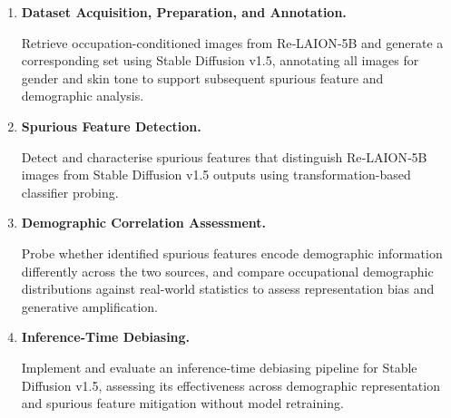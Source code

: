 \begin{enumerate}
	\item \textbf{Dataset Acquisition, Preparation, and Annotation.}
	
	Retrieve occupation-conditioned images from Re‐LAION‐5B and generate a corresponding set using Stable Diffusion v1.5, annotating all images for gender and skin tone to support subsequent spurious feature and demographic analysis.
	
	\item \textbf{Spurious Feature Detection.}
	
	Detect and characterise spurious features that distinguish Re‐LAION‐5B images from Stable Diffusion v1.5 outputs using transformation-based classifier probing.
	
	\item \textbf{Demographic Correlation Assessment.}
	
	Probe whether identified spurious features encode demographic information differently across the two sources, and compare occupational demographic distributions against real‐world statistics to assess representation bias and generative amplification.
	
	\item \textbf{Inference-Time Debiasing.}

	Implement and evaluate an inference-time debiasing pipeline for Stable Diffusion v1.5, assessing its effectiveness across demographic representation and spurious feature mitigation without model retraining.
	

\end{enumerate}
